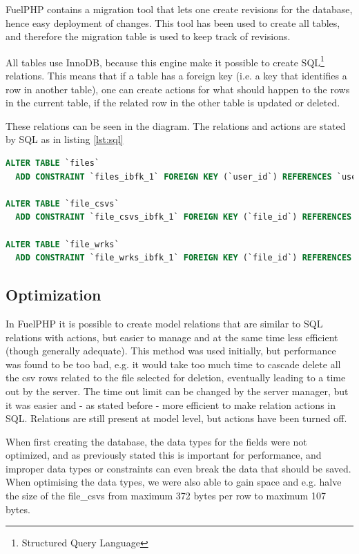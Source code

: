 FuelPHP contains a \textsf{migration} tool that lets one create revisions for the database, hence easy deployment of changes. This tool has been used to create all tables, and therefore the \textsf{migration} table is used to keep track of revisions.

All tables use \textsf{InnoDB}, because this engine make it possible to create SQL\footnote{Structured Query Language} relations. This means that if a table has a foreign key (i.e. a key that identifies a row in another table), one can create actions for what should happen to the rows in the current table, if the related row in the other table is \textsf{updated} or \textsf{deleted}.

These relations can be seen in the diagram. The relations and actions are stated by SQL as in listing \ref{lst:sql}
\begin{lstlisting}[language=sql,caption={SQL relations and actions},label={lst:sql}]
ALTER TABLE `files`
  ADD CONSTRAINT `files_ibfk_1` FOREIGN KEY (`user_id`) REFERENCES `users` (`id`) ON DELETE NO ACTION ON UPDATE NO ACTION;

ALTER TABLE `file_csvs`
  ADD CONSTRAINT `file_csvs_ibfk_1` FOREIGN KEY (`file_id`) REFERENCES `files` (`id`) ON DELETE CASCADE ON UPDATE NO ACTION;

ALTER TABLE `file_wrks`
  ADD CONSTRAINT `file_wrks_ibfk_1` FOREIGN KEY (`file_id`) REFERENCES `files` (`id`) ON DELETE CASCADE ON UPDATE NO ACTION;
\end{lstlisting}

\subsection{Optimization}
\label{sec:database_optimization}
In FuelPHP it is possible to create model relations that are similar to SQL relations with actions, but easier to manage and at the same time less efficient (though generally adequate). This method was used initially, but performance was found to be too bad, e.g. it would take too much time to cascade delete all the csv rows related to the file selected for deletion, eventually leading to a time out by the server. The time out limit can be changed by the server manager, but it was easier and - as stated before - more efficient to make relation actions in SQL. Relations are still present at model level, but actions have been turned off.

When first creating the database, the data types for the fields were not optimized, and as previously stated this is important for performance, and improper data types or constraints can even break the data that should be saved. When optimising the data types, we were also able to gain space and e.g. halve the size of the \textsf{file\_csvs} from maximum 372 bytes per row to maximum 107 bytes.

